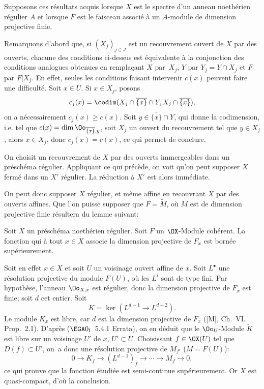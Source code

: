Supposons ces r\'esultats acquis lorsque $X$ est le spectre d'un anneau noeth\'erien r\'egulier $A$ et lorsque $F$ est le faisceau associ\'e \`a un $A$-module de dimension projective finie.

Remarquons d'abord que, si $(X_j)_{j\in
J}$ est un recouvrement ouvert de $X$ par des ouverts, chacune des conditions
ci-dessus est \'equivalente \`a la conjonction des conditions
analogues obtenues en rempla\c cant $X$ par~$X_j$, $Y$ par
$Y_j=Y\cap X_j$ et $F$ par
$F{|X_j}$. En effet, seules les conditions
faisant intervenir $c(x)$ peuvent faire une difficult\'e. Soit $x\in
U$. Si $x\in X_j$, posons
\[
c_j(x)=\codim(X_j\cap \overline{\{x\}}\cap Y, X_j\cap\overline{\{x\}}),
\]
on a n\'ecessairement $c_j(x)\geq c(x)$. Soit $y\in
\overline{\{x\}}\cap Y$, qui \og donne la codimension\fg, i.e. tel
que $c(x)=\dim \Oo_{\overline{\{x\}}, y}$, soit $X_j$ un ouvert du
recouvrement tel que $y\in X_j$, alors $x\in X_j$, donc
$c_j(x)=c(x)$, ce qui permet de conclure.

On choisit un recouvrement de $X$ par des ouverts immergeables dans un pr\'esch\'ema r\'egulier. Appliquant ce qui pr\'ec\`ede, on voit qu'on peut supposer $X$ ferm\'e dans un $X'$ r\'egulier. La r\'eduction \`a $X'$ est alors imm\'ediate.

On peut donc supposer $X$ r\'egulier, et m\^eme affine en recouvrant $X$ par des ouverts affines. Que l'on puisse supposer que $F=\widetilde{M}$, o\`u $M$ est de dimension projective finie r\'esultera du lemme suivant:

\begin{lemme} \label{VIII.2.4}
Soit $X$ un pr\'esch\'ema noeth\'erien r\'egulier. Soit $F$ un $\OX$-Module coh\'erent. La fonction qui \`a tout $x\in X$ associe la dimension projective de $F_x$ est born\'ee sup\'erieurement.
\end{lemme}

\setcounter{equation}{1}

Soit en effet $x\in X$ et soit $U$ un voisinage ouvert affine de $x$. Soit $L^\bullet$ une r\'esolution projective du module $F(U)$, o\`u les $L^i$ sont de type fini. Par hypoth\`ese, l'anneau $\Oo_{X, x}$ est r\'egulier, donc la dimension projective de $F_x$ est finie; soit $d$ cet entier. Soit
\[
K=\ker(L^{d-1}\to L^{d-2}).
\]
Le module $K_x$ est libre, car $d$ est la dimension projective de $F_x$ ([M], Ch.\, VI. Prop.\, 2.1). D'apr\`es ($\EGA 0_{\textup{I}}$~5.4.1 Errata), on en d\'eduit que le $\Oo_U$-Module $\widetilde{K}$ est libre sur un voisinage $U'$ de $x$, $U'\subset U$. Choisissant $f\in \OX(U)$ tel que $D(f)\subset U'$, on~a donc une r\'esolution projective de $M_{f'}$ ($M=F(U)$):
\[0\to K_f \to (L^{d-1})_f\to \cdots \to M_f\to 0, \]
ce qui prouve que la fonction \'etudi\'ee est semi-continue sup\'erieurement. Or $X$ est quasi-compact, d'o\`u la conclusion.

